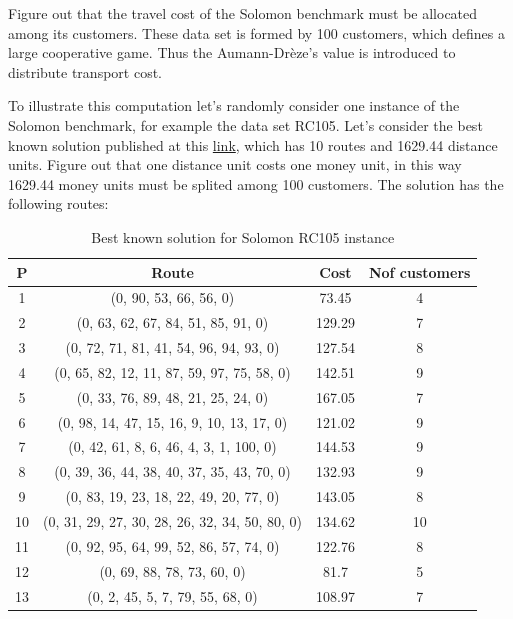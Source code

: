 Figure out that the travel cost of the Solomon benchmark must be allocated among its customers. These data set is formed by 100 customers, which defines a large cooperative game. Thus the Aumann-Dr\`eze's value is introduced to distribute transport cost.

To illustrate this computation let's randomly consider one instance of the Solomon benchmark, for example the data set RC105. Let's consider the best known solution published at this \href{https://www.sintef.no/projectweb/top/vrptw/solomon-benchmark/100-customers/}{link}, which has 10 routes and 1629.44 distance units. Figure out that one distance unit costs one money unit, in this way 1629.44 money units must be splited among 100 customers. The solution has the following routes:

\begin{table}[H]
	\centering
	\begin{tabular}{c| c |c |c}
		\hline 
		P	&	Route & Cost & N\textordmasculine of customers	\\
		\hline
		1  & (0, 90, 53, 66, 56, 0) & 73.45 & 4 \\
		2  & (0, 63, 62, 67, 84, 51, 85, 91, 0) & 129.29 & 7 \\
		3  & (0, 72, 71, 81, 41, 54, 96, 94, 93, 0) & 127.54 & 8 \\
		4  & (0, 65, 82, 12, 11, 87, 59, 97, 75, 58, 0) & 142.51 & 9 \\
		5  & (0, 33, 76, 89, 48, 21, 25, 24, 0) & 167.05 & 7 \\
		6  & (0, 98, 14, 47, 15, 16, 9, 10, 13, 17, 0) & 121.02 & 9 \\
		7  & (0, 42, 61, 8, 6, 46, 4, 3, 1, 100, 0) & 144.53 & 9 \\
		8  & (0, 39, 36, 44, 38, 40, 37, 35, 43, 70, 0) & 132.93 & 9 \\
		9  & (0, 83, 19, 23, 18, 22, 49, 20, 77, 0) & 143.05 & 8 \\
		10 & (0, 31, 29, 27, 30, 28, 26, 32, 34, 50, 80, 0) & 134.62 & 10 \\
		11 & (0, 92, 95, 64, 99, 52, 86, 57, 74, 0) & 122.76 & 8 \\
		12 & (0, 69, 88, 78, 73, 60, 0) & 81.7 & 5 \\
		13 & (0, 2, 45, 5, 7, 79, 55, 68, 0) & 108.97 & 7 \\
		\hline 
	\end{tabular} \
	\caption{Best known solution for Solomon RC105 instance}
	\label{routes}
\end{table}\


